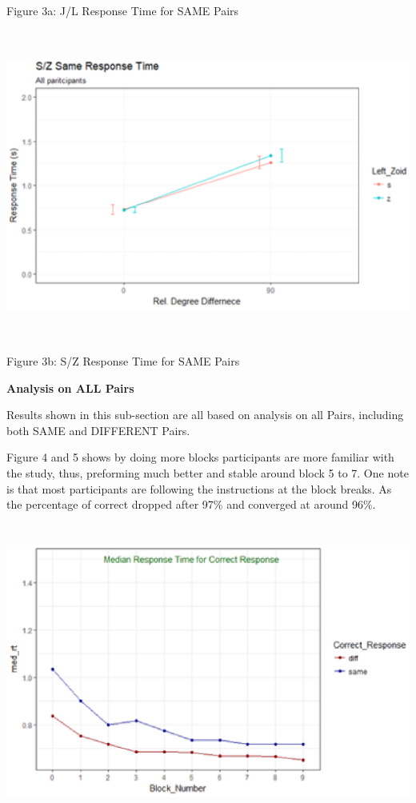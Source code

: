 \documentclass{article}
\begin{document}
	\noindent Figure 3a: J/L Response Time for SAME Pairs
	
	\noindent \includegraphics*[width=6.33in, height=4.02in, keepaspectratio=false, trim=0.11in 0.00in 0.00in 0.00in]{image20}
	
	\noindent  Figure 3b: S/Z Response Time for SAME Pairs
	
	\noindent \textbf{Analysis on ALL Pairs}
	
	\noindent Results shown in this sub-section are all based on analysis on all Pairs, including both SAME and DIFFERENT Pairs.
	
	\noindent Figure 4 and 5 shows by doing more blocks participants are more familiar with the study, thus, preforming much better and stable around block 5 to 7. One note is that most participants are following the instructions at the block breaks. As the percentage of correct dropped after 97\% and converged at around 96\%.
	
	\noindent \includegraphics*[width=6.20in, height=3.82in, keepaspectratio=false]{image21}\textbf{}
	
\end{document}
